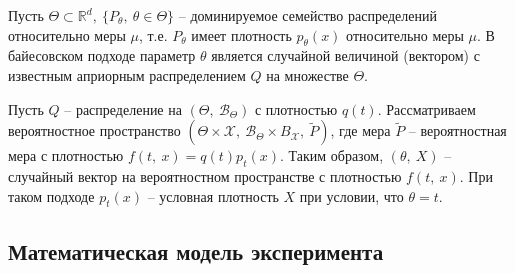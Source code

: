 Пусть $\displaystyle \Theta \subset \mathbb{R}^{d} ,\ \{P_{\theta } ,\ \theta \in \Theta \}$ -- доминируемое семейство распределений относительно меры $\displaystyle \mu $, т.е. $\displaystyle P_{\theta }$ имеет плотность $\displaystyle p_{\theta }( x)$ относительно меры $\displaystyle \mu $. В байесовском подходе параметр $\displaystyle \theta $ является случайной величиной (вектором) с известным априорным распределением $\displaystyle Q$ на множестве $\displaystyle \Theta $.

Пусть $\displaystyle Q$ -- распределение на $\displaystyle ( \Theta ,\ \mathcal{B}_{\Theta })$ с плотностью $\displaystyle q( t)$. Рассматриваем вероятностное пространство $\displaystyle \left( \Theta \times \mathcal{X} ,\ \mathcal{B}_{\Theta } \times B_{\mathcal{X}} ,\ \tilde{P}\right)$, где мера $\displaystyle \tilde{P}$ -- вероятностная мера с плотностью $\displaystyle f( t,\ x) =q( t) p_{t}( x)$. Таким образом, $\displaystyle ( \theta ,\ X)$ -- случайный вектор на вероятностном пространстве с плотностью $\displaystyle f( t,\ x)$. При таком подходе $\displaystyle p_{t}( x)$ -- условная плотность $\displaystyle X$ при условии, что $\displaystyle \theta =t$.
\subsection{Математическая модель эксперимента}

